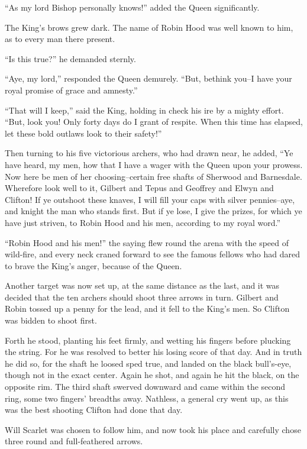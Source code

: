 ``As my lord Bishop personally knows!'' added the Queen significantly.

The King's brows grew dark. The name of Robin Hood was well known to
him, as to every man there present.

``Is this true?'' he demanded sternly.

``Aye, my lord,'' responded the Queen demurely. ``But, bethink you--I
have your royal promise of grace and amnesty.''

``That will I keep,'' said the King, holding in check his ire by a
mighty effort. ``But, look you! Only forty days do I grant of respite.
When this time has elapsed, let these bold outlaws look to their
safety!''

Then turning to his five victorious archers, who had drawn near, he
added, ``Ye have heard, my men, how that I have a wager with the Queen
upon your prowess. Now here be men of her choosing--certain free shafts
of Sherwood and Barnesdale. Wherefore look well to it, Gilbert and Tepus
and Geoffrey and Elwyn and Clifton! If ye outshoot these knaves, I will
fill your caps with silver pennies--aye, and knight the man who stands
first. But if ye lose, I give the prizes, for which ye have just
striven, to Robin Hood and his men, according to my royal word.''

``Robin Hood and his men!'' the saying flew round the arena with the
speed of wild-fire, and every neck craned forward to see the famous
fellows who had dared to brave the King's anger, because of the Queen.

Another target was now set up, at the same distance as the last, and it
was decided that the ten archers should shoot three arrows in turn.
Gilbert and Robin tossed up a penny for the lead, and it fell to the
King's men. So Clifton was bidden to shoot first.

Forth he stood, planting his feet firmly, and wetting his fingers before
plucking the string. For he was resolved to better his losing score of
that day. And in truth he did so, for the shaft he loosed sped true, and
landed on the black bull's-eye, though not in the exact center. Again he
shot, and again he hit the black, on the opposite rim. The third shaft
swerved downward and came within the second ring, some two fingers'
breadths away. Nathless, a general cry went up, as this was the best
shooting Clifton had done that day.

Will Scarlet was chosen to follow him, and now took his place and
carefully chose three round and full-feathered arrows.

